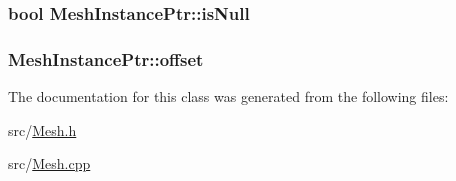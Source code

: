 \subsubsection[{\texorpdfstring{is\+Null}{isNull}}]{\setlength{\rightskip}{0pt plus 5cm}bool Mesh\+Instance\+Ptr\+::is\+Null\hspace{0.3cm}{\ttfamily [protected]}}\hypertarget{class_mesh_instance_ptr_a64b684e33c846dbcdff7b53188d41238}{}\label{class_mesh_instance_ptr_a64b684e33c846dbcdff7b53188d41238}
\subsubsection[{\texorpdfstring{offset}{offset}}]{ Mesh\+Instance\+Ptr\+::offset\hspace{0.3cm}{\ttfamily [protected]}}\hypertarget{class_mesh_instance_ptr_ad99534feeaecaafcf4d8329723de2ffd}{}\label{class_mesh_instance_ptr_ad99534feeaecaafcf4d8329723de2ffd}


The documentation for this class was generated from the following files\+:\begin{DoxyCompactItemize}
\item 
src/\hyperlink{_mesh_8h}{Mesh.\+h}\item 
src/\hyperlink{_mesh_8cpp}{Mesh.\+cpp}\end{DoxyCompactItemize}
